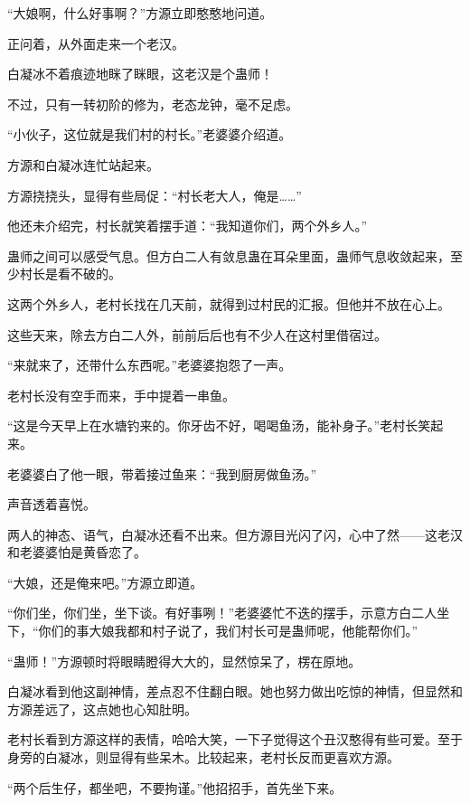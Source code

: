 
\begin{this_body}

“大娘啊，什么好事啊？”方源立即憨憨地问道。

正问着，从外面走来一个老汉。

白凝冰不着痕迹地眯了眯眼，这老汉是个蛊师！

不过，只有一转初阶的修为，老态龙钟，毫不足虑。

“小伙子，这位就是我们村的村长。”老婆婆介绍道。

方源和白凝冰连忙站起来。

方源挠挠头，显得有些局促：“村长老大人，俺是……”

他还未介绍完，村长就笑着摆手道：“我知道你们，两个外乡人。”

蛊师之间可以感受气息。但方白二人有敛息蛊在耳朵里面，蛊师气息收敛起来，至少村长是看不破的。

这两个外乡人，老村长找在几天前，就得到过村民的汇报。但他并不放在心上。

这些天来，除去方白二人外，前前后后也有不少人在这村里借宿过。

“来就来了，还带什么东西呢。”老婆婆抱怨了一声。

老村长没有空手而来，手中提着一串鱼。

“这是今天早上在水塘钓来的。你牙齿不好，喝喝鱼汤，能补身子。”老村长笑起来。

老婆婆白了他一眼，带着接过鱼来：“我到厨房做鱼汤。”

声音透着喜悦。

两人的神态、语气，白凝冰还看不出来。但方源目光闪了闪，心中了然——这老汉和老婆婆怕是黄昏恋了。

“大娘，还是俺来吧。”方源立即道。

“你们坐，你们坐，坐下谈。有好事咧！”老婆婆忙不迭的摆手，示意方白二人坐下，“你们的事大娘我都和村子说了，我们村长可是蛊师呢，他能帮你们。”

“蛊师！”方源顿时将眼睛瞪得大大的，显然惊呆了，楞在原地。

白凝冰看到他这副神情，差点忍不住翻白眼。她也努力做出吃惊的神情，但显然和方源差远了，这点她也心知肚明。

老村长看到方源这样的表情，哈哈大笑，一下子觉得这个丑汉憨得有些可爱。至于身旁的白凝冰，则显得有些呆木。比较起来，老村长反而更喜欢方源。

“两个后生仔，都坐吧，不要拘谨。”他招招手，首先坐下来。


\end{this_body}
